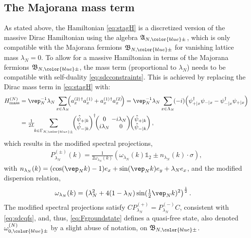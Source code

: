 \documentclass[a4paper, 11pt]{article}
\newcommand{\fA}{\mathfrak{A}}\newcommand{\cA}{\mathcal{A}}\newcommand{\dA}{\mathds{A}}\newcommand{\sA}{\mathscr{A}}
\newcommand{\fB}{\mathfrak{B}}\newcommand{\cB}{\mathcal{B}}\newcommand{\dB}{\mathds{B}}\newcommand{\sB}{\mathscr{B}}
\DeclareMathOperator{\1}{\mathds{1}}
\begin{document}
\subsection{The Majorana mass term}
\label{sec:majmass}
As stated above, the Hamiltonian \eqref{eq:stagH} is a discretized version of the massive Dirac Hamiltonian using the algebra $\fA_{N,{\color{blue}\pm}}$, which is only compatible with the Majorana fermions $\fB_{N,{\color{blue}\pm}}$ for vanishing lattice mass $\lambda_{N}=0$. To allow for a massive Hamiltonian in terms of the Majorana fermions $\fB_{N,{\color{blue}\pm}}$, the mass term (proportional to $\lambda_{N}$) needs to be compatible with self-duality \eqref{eq:sdcconstraints}. This is achieved by replacing the Dirac mass term in \eqref{eq:stagH} with:
\begin{align}
\label{eq:majmass}
H^{(N)}_{\textup{mass}} & = \vep_{N}^{-1}\lambda_{N}\sum_{x\in\Lambda_{N}}\!\!\!\left(a^{(2)\!\!\ \dagger}_{x}a^{(1)}_{x} + a^{(1)\!\!\ \dagger}_{x}a^{(2)}_{x}\!\right) = \vep_{N}^{-1}\lambda_{N}\sum_{x\in\Lambda_{N}}\!(-i)\!\left(\psi^{\dagger}_{+|x}\psi_{-|x} - \psi^{\dagger}_{-|x}\psi_{+|x}\right) \\ \nonumber
 & = \tfrac{1}{2L}\!\!\sum_{k\in\Gamma_{N,{\color{blue}\pm}}}\!\!\begin{pmatrix} \hat{\psi}_{+|k} \\ \hat{\psi}_{-|k} \end{pmatrix}^{\dagger}\!\! \begin{pmatrix} 0 & \!\!\!\!-i\lambda_{N} \\ i \lambda_{N} & 0 \end{pmatrix}\!\! \begin{pmatrix} \hat{\psi}_{+|k} \\ \hat{\psi}_{-|k} \end{pmatrix},
\end{align}
which results in the modified spectral projections,
\begin{align}
\label{eq:majproj}
P^{(\pm)}_{\lambda_{N}}(k) = \tfrac{1}{2\omega_{\lambda_{N}}(k)}(\omega_{\lambda_{N}}(k)\mathds{1}_{2} \pm n_{\lambda_{N}}(k)\cdot\sigma),
\end{align}
with $n_{\lambda_{N}}(k) = (\cos(\vep_{N}k)-1)e_{x} + \sin(\vep_{N}k)e_{y} + \lambda_{N}e_{x}$, and the modified dispersion relation,
\begin{align}
\label{eq:majdis}
\omega_{\lambda_{N}}(k) & = \left(\lambda_{N}^{2}+4(1-\lambda_{N})\sin(\tfrac{1}{2}\vep_{N}k)^{2}\right)^{\frac{1}{2}}.
\end{align}
The modified spectral projections satisfy $CP^{(+)}_{\lambda_{N}} = P^{(-)}_{\lambda_{N}}C$, consistent with \eqref{eq:sdcqfs}, and, thus, \eqref{eq:Fgroundstate} defines a quasi-free state, also denoted $\omega^{(N)}_{0,{\color{blue}\pm}}$ by a slight abuse of notation, on $\fB_{N,{\color{blue}\pm}}$.
\end{document}
